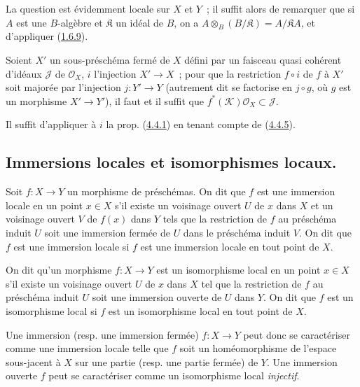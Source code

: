La question est évidemment locale sur $X$ et $Y$~; il suffit alors de
remarquer que si $A$ est une $B$-algèbre et $\mathfrak{K}$ un idéal de $B$,
on a $A\otimes_B(B/\mathfrak{K})=A/\mathfrak{K}A$, et d'appliquer
(\hyperref[I.1.6.9-fr]{1.6.9}).

\begin{corollary}[4.4.6]
\label{I.4.4.6-fr}
Soient $X'$ un sous-préschéma fermé de $X$ défini par un faisceau quasi
cohérent d'idéaux $\mathscr{J}$ de $\mathscr{O}_X$, $i$ l'injection
$X'\to X$~; pour que la restriction $f\circ i$ de $f$ à $X'$ soit majorée
par l'injection $j:Y'\to Y$ \textup{(autrement dit se factorise en $j\circ g$, où
$g$ est un morphisme $X'\to Y'$)}, il faut et il suffit que
$f^*(\mathscr{K})\mathscr{O}_X\subset\mathscr{J}$.
\end{corollary}

Il suffit d'appliquer à $i$ la prop. (\hyperref[I.4.4.1-fr]{4.4.1}) en
tenant compte de (\hyperref[I.4.4.5-fr]{4.4.5}).

\subsection{Immersions locales et isomorphismes locaux.}
\label{subsection:I.4.5-fr}

\begin{definition}[4.5.1]
\label{I.4.5.1-fr}
Soit $f:X\to Y$ un morphisme de préschémas. On dit que $f$ est une
immersion locale en un point $x\in X$ s'il existe un voisinage ouvert
$U$ de $x$ dans $X$ et un voisinage ouvert $V$ de $f(x)$ dans $Y$ tels que
la restriction de $f$ au préschéma induit $U$ soit une immersion fermée de
$U$ dans le préschéma induit $V$. On dit que $f$ est une immersion locale si
$f$ est une immersion locale en tout point de $X$.
\end{definition}

\begin{definition}[4.5.2]
\label{I.4.5.2-fr}
On dit qu'un morphisme $f:X\to Y$ est un isomorphisme local en
un point $x\in X$ s'il existe un voisinage ouvert $U$ de $x$ dans $X$ tel
que la restriction de $f$ au préschéma induit $U$ soit une immersion ouverte
de $U$ dans $Y$. On dit que $f$ est un isomorphisme local si $f$ est un
isomorphisme local en tout point de $X$.
\end{definition}

\begin{env}[4.5.3]
\label{I.4.5.3-fr}
Une immersion (resp. une immersion fermée) $f:X\to Y$ peut donc se
caractériser comme une immersion locale telle que $f$ soit un homéomorphisme
de l'espace sous-jacent à $X$ sur une partie (resp. une partie fermée) de
$Y$. Une immersion ouverte $f$ peut se caractériser comme un isomorphisme
local \emph{injectif}.
\end{env}

